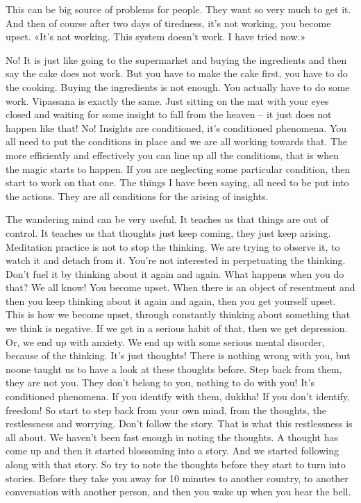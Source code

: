 \documentclass[letterpaper,10pt,english]{sphinxmanual}
\begin{document}
\sphinxAtStartPar
This  can  be  big  source  of  problems  for  people.  They  want  so  very
much to get it. And then of course after two days of tiredness, it’s not working, you become upset. «It’s not working. This system doesn’t work. I have
tried now.»

\sphinxAtStartPar
No! It is just like going to the supermarket and buying the ingredients
and then say the cake does not work. But you have to make the cake first,
you have to do the cooking. Buying the ingredients is not enough. You actually  have  to  do  some  work. Vipassana  is  exactly  the  same.  Just  sitting  on
the mat with your eyes closed and waiting for some insight to fall from the
heaven – it just does not happen like that! No! Insights are conditioned, it’s
conditioned phenomena. You all need to put the conditions in place and we
are all working towards that. The more efficiently and effectively you can
line up all the conditions, that is when the magic starts to happen. If you are
neglecting  some  particular  condition,  then  start  to  work  on  that  one.  The
things I have been saying, all need to be put into the actions. They are all
conditions for the arising of insights.

\sphinxAtStartPar
The wandering mind can be very useful. It teaches us that things are out
of control. It teaches us that thoughts just keep coming, they just keep arising. Meditation practice is not to stop the thinking. We are trying to observe
it, to watch it and detach from it. You’re not interested in perpetuating the
thinking. Don’t fuel it by thinking about it again and again. What happens
when you do that? We all know! You become upset. When there is an object
of resentment and then you keep thinking about it again and again, then you
get yourself upset. This is how we become upset, through constantly thinking about something that we think is negative. If we get in a serious habit
of that, then we get depression. Or, we end up with anxiety. We end up with
some  serious  mental  disorder,  because  of  the  thinking.  It’s  just  thoughts!
  There is nothing wrong with you, but no\sphinxhyphen{}one taught us to have a look at these
thoughts before. Step back from them, they are not you. They don’t belong
to you, nothing to do with you! It’s conditioned phenomena. If you identify
with them, dukkha! If you don’t identify, freedom! So start to step back from
your  own  mind,  from  the  thoughts,  the  restlessness  and  worrying.  Don’t
follow the story. That is what this restlessness is all about. We haven’t been
fast enough in noting the thoughts. A thought has come up and then it started
blossoming into a story. And we started following along with that story. So
try to note the thoughts before they start to turn into stories. Before they take
you away for 10 minutes to another country, to another conversation with
another person, and then you wake up when you hear the bell.
\end{document}
